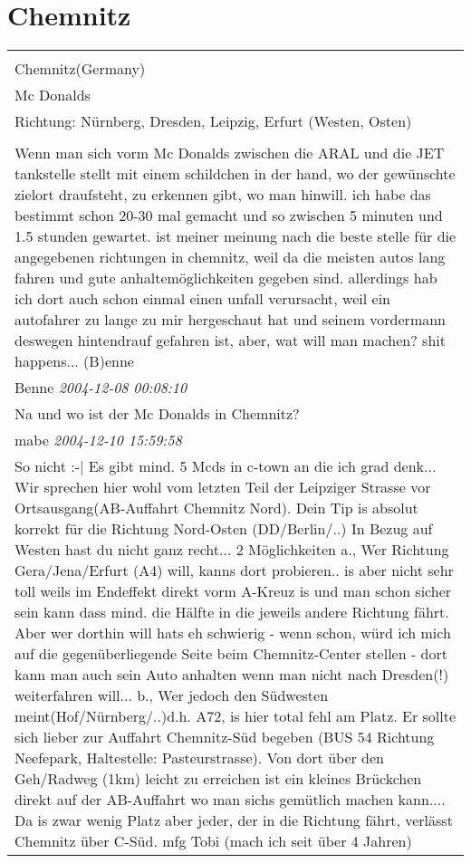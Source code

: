 \documentclass[a4paper,12pt]{article}
\begin{document}
\section{Chemnitz}
\begin{tabular}{|p{13cm}|}
\hline\\
Chemnitz(Germany)\\
Mc Donalds\\
Richtung: Nürnberg, Dresden, Leipzig, Erfurt (Westen, Osten) \\
\hline\\
Wenn man sich vorm Mc Donalds zwischen die ARAL und die JET tankstelle stellt mit einem schildchen in der hand, wo der gewünschte zielort draufsteht, zu erkennen gibt, wo man hinwill. ich habe das bestimmt schon 20-30 mal gemacht und so zwischen 5 minuten und 1.5 stunden gewartet. ist meiner meinung nach die beste stelle für die angegebenen richtungen in chemnitz, weil da die meisten autos lang fahren und gute anhaltemöglichkeiten gegeben sind. allerdings hab ich dort auch schon einmal einen unfall verursacht, weil ein autofahrer zu lange zu mir hergeschaut hat und seinem vordermann deswegen hintendrauf gefahren ist, aber, wat will man machen? shit happens... (B)enne \\
Benne \textit{ 2004-12-08 00:08:10 }\\\hline Na und wo ist der Mc Donalds in Chemnitz? \\
mabe \textit{ 2004-12-10 15:59:58 }\\\hline So nicht :-|
Es gibt mind. 5 Mcds in c-town an die ich grad denk... Wir sprechen hier wohl vom letzten Teil der Leipziger Strasse vor Ortsausgang(AB-Auffahrt Chemnitz Nord). Dein Tip is absolut korrekt für die Richtung Nord-Osten (DD/Berlin/..) In Bezug auf Westen hast du nicht ganz recht...
2 Möglichkeiten
a., Wer Richtung Gera/Jena/Erfurt (A4) will, kanns dort probieren.. is aber nicht sehr toll weils im Endeffekt direkt vorm A-Kreuz is und man schon sicher sein kann dass mind. die Hälfte in die jeweils andere Richtung fährt. Aber wer dorthin will hats eh schwierig - wenn schon, würd ich mich auf die gegenüberliegende Seite beim Chemnitz-Center stellen - dort kann man auch sein Auto anhalten wenn man nicht nach Dresden(!) weiterfahren will...
b.,
Wer jedoch den Südwesten meint(Hof/Nürnberg/..)d.h. A72, is hier total fehl am Platz. Er sollte sich lieber zur Auffahrt Chemnitz-Süd begeben (BUS 54 Richtung Neefepark, Haltestelle: Pasteurstrasse). Von dort über den Geh/Radweg (1km) leicht zu erreichen ist ein kleines Brückchen direkt auf der AB-Auffahrt wo man sichs gemütlich machen kann.... Da is zwar wenig Platz aber jeder, der in die Richtung fährt, verlässt Chemnitz über C-Süd. mfg Tobi (mach ich seit über 4 Jahren) \\

\end{tabular}
\end{document}
